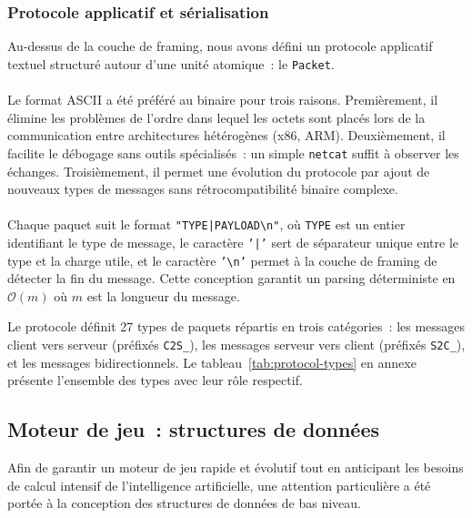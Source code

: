 \documentclass[a4paper]{article}
\begin{document}
\subsubsection{Protocole applicatif et sérialisation}
\label{subsec:protocol}
 
Au-dessus de la couche de framing, nous avons défini un protocole applicatif
textuel structuré autour d'une unité atomique~: le \texttt{Packet}.
 
\paragraph{}
Le format ASCII a été préféré au binaire pour trois raisons. Premièrement, il
élimine les problèmes de l'ordre dans lequel les octets sont placés lors de la communication
entre architectures hétérogènes (x86, ARM). Deuxièmement, il facilite le
débogage sans outils spécialisés~: un simple \texttt{netcat} suffit à observer
les échanges. Troisièmement, il permet une évolution du protocole par ajout de
nouveaux types de messages sans rétrocompatibilité binaire complexe.
 
\paragraph{}
Chaque paquet suit le format \texttt{"TYPE|PAYLOAD\textbackslash{}n"}, où
\texttt{TYPE} est un entier identifiant le type de message, le caractère
\texttt{'|'} sert de séparateur unique entre le type et la charge utile, et
le caractère \texttt{'\textbackslash{}n'} permet à la couche de framing de
détecter la fin du message. Cette conception garantit un parsing déterministe
en $\mathcal{O}(m)$ où $m$ est la longueur du message.
 
Le protocole définit 27 types de paquets répartis en trois catégories~: les
messages client vers serveur (préfixés \texttt{C2S\_}), les messages serveur
vers client (préfixés \texttt{S2C\_}), et les messages bidirectionnels. Le
tableau~\ref{tab:protocol-types} en annexe présente l'ensemble des types avec
leur rôle respectif.
 
\newpage
\subsection{Moteur de jeu~: structures de données}
\label{sec:engine-data}

Afin de garantir un moteur de jeu rapide et évolutif tout en anticipant
les besoins de calcul intensif de l'intelligence artificielle, une attention
particulière a été portée à la conception des structures de données de bas
niveau.
\end{document}
